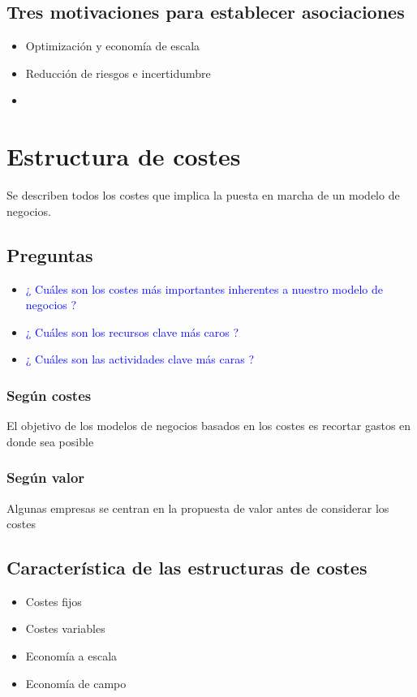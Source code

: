 \documentclass[11pt]{book}
\begin{document}
\section{Tres motivaciones para establecer asociaciones}
\begin{itemize}
\item Optimización y economía de escala
\item Reducción de riesgos e incertidumbre
\item 
\end{itemize}
\chapter{Estructura de costes}
Se describen todos los costes que implica la puesta en marcha de un modelo de negocios.\\
\section{Preguntas}
\begin{itemize}
\item\textcolor{blue}{¿ Cuáles son los costes más importantes inherentes a nuestro modelo de negocios ?} 
\item\textcolor{blue}{¿ Cuáles son los recursos clave más caros ?}
\item\textcolor{blue}{¿ Cuáles son las actividades clave más caras ?}
\end{itemize}
\subsection{Según costes}
El objetivo de los modelos de negocios basados en los costes es recortar gastos en donde sea posible
\subsection{Según valor}
Algunas empresas se centran en la propuesta de valor antes de considerar los costes
\section{Característica de las estructuras de costes}
\begin{itemize}
\item Costes fijos 
\item Costes variables
\item Economía a escala
\item Economía de campo
\end{itemize}
\end{document}
